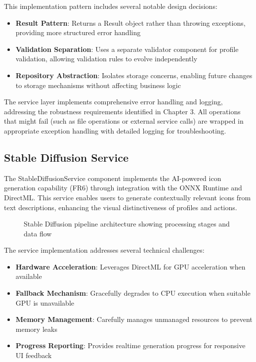 This implementation pattern includes several notable design decisions:

\begin{itemize}
    \item \textbf{Result Pattern}: Returns a Result object rather than throwing exceptions, providing more structured error handling
    \item \textbf{Validation Separation}: Uses a separate validator component for profile validation, allowing validation rules to evolve independently
    \item \textbf{Repository Abstraction}: Isolates storage concerns, enabling future changes to storage mechanisms without affecting business logic
\end{itemize}

The service layer implements comprehensive error handling and logging, addressing the robustness requirements identified in Chapter 3. All operations that might fail (such as file operations or external service calls) are wrapped in appropriate exception handling with detailed logging for troubleshooting.

\subsection{Stable Diffusion Service}
The StableDiffusionService component implements the AI-powered icon generation capability (FR6) through integration with the ONNX Runtime and DirectML. This service enables users to generate contextually relevant icons from text descriptions, enhancing the visual distinctiveness of profiles and actions.

\begin{figure}[h]
\centering
\caption{Stable Diffusion pipeline architecture showing processing stages and data flow}
\label{fig:stable_diffusion_pipeline}
\end{figure}

The service implementation addresses several technical challenges:

\begin{itemize}
    \item \textbf{Hardware Acceleration}: Leverages DirectML for GPU acceleration when available
    \item \textbf{Fallback Mechanism}: Gracefully degrades to CPU execution when suitable GPU is unavailable
    \item \textbf{Memory Management}: Carefully manages unmanaged resources to prevent memory leaks
    \item \textbf{Progress Reporting}: Provides realtime generation progress for responsive UI feedback
\end{itemize}

